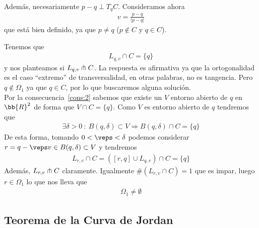 Además, necesariamente $p-q \perp T_qC$. Consideramos ahora 
\begin{gather*}
    v = \frac{p-q}{|p-q|}
\end{gather*}
que está bien definido, ya que $p\neq q$ ($p\notin C$ y $q\in C$). 


Tenemos que 
\begin{gather*}
    L_{q,v} \cap C = \{q\}
\end{gather*}
y nos planteamos si $L_{q,v} \pitchfork C$. La respuesta es afirmativa ya que la ortogonalidad es el caso ``extremo'' de transversalidad, en otras palabras, no es tangencia. Pero $q\notin \Omega_1$ ya que $q\in C$, por lo que buscaremos alguna solución.\\

Por la consecuencia~\ref{cons:2} sabemos que existe un $V$ entorno abierto de $q$ en $\bb{R}^2$ de forma que $V\cap C = \{q\}$. Como $V$ es entorno abierto de $q$ tendremos que 
\begin{gather*}
    \exists \delta >0 \ : \ B(q, \delta)\subset V \Rightarrow B(q, \delta)\cap C = \{q\}
\end{gather*}
De esta forma, tomando $0<\veps<\delta$ podemos considerar $r=q - \veps v \in B(q, \delta)\subset V$ y tendremos
\begin{gather*}
    L_{r,v}\cap C = ([r,q]\cup L_{q,v})\cap C = \{q\}
\end{gather*}
Además, $L_{r,v}\pitchfork C$ claramente. Igualmente $\#(L_{r,v}\cap C)=1$
que es impar, luego $r\in \Omega_1$ lo que nos lleva que 
\begin{gather*}
    \boxed{\Omega_1 \neq \emptyset}
\end{gather*}

\subsection{Teorema de la Curva de Jordan}

